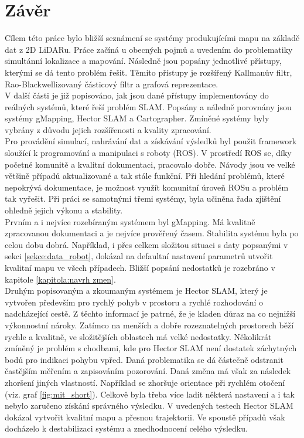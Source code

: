 \documentclass[12pt]{report}
\begin{document}
\chapter{Závěr}
Cílem této práce bylo bližší seznámení se systémy produkujícími mapu na základě dat z 2D LiDARu. Práce začíná u obecných pojmů a uvedením do problematiky simultánní lokalizace a mapování. Následně jsou popsány jednotlivé přístupy, kterými se dá tento problém řešit. Těmito přístupy je rozšířený Kallmanův filtr, Rao-Blackwellizovaný částicový filtr a grafová reprezentace.\\
\indent V další části je již popisováno, jak jsou dané přístupy implementovány do reálných systémů, které řeší problém SLAM. Popsány a náledně porovnány jsou systémy gMapping, Hector SLAM a Cartographer. Zmíněné systémy byly vybrány z důvodu jejich rozšířenosti a kvality zpracování.\\
\indent Pro provádění simulací, nahrávání dat a získávání výsledků byl použit framework sloužící k programování a manipulaci s roboty (ROS). V prostředí ROS se, díky početné komunitě a kvalitní dokumentaci, pracovalo dobře. Návody jsou ve velké většině případů aktualizované a tak stále funkční. Při hledání problémů, které nepokrývá dokumentace, je možnost využít komunitní úroveň ROSu a problém tak vyřešit. Při práci se samotnými třemi systémy, byla učiněna řada zjištění ohledně jejich výkonu a stability. \\
\indent Prvním a i nejvíce rozebíraným systémem byl gMapping. Má kvalitně zpracovanou dokumentaci a je nejvíce prověřený časem. Stabilita systému byla po celou dobu dobrá. Například, i přes celkem složitou situaci s daty popsanými v sekci \ref{sekce:data_robot}, dokázal na defaultní nastavení parametrů utvořit kvalitní mapu ve všech případech. Bližší popsání nedostatků je rozebráno v kapitole \ref{kapitola:navrh zmen}.\\
\indent Druhým popisovaným a zkoumaným systémem je Hector SLAM, který je vytvořen především pro rychlý pohyb v prostoru a rychlé rozhodování o nadcházející cestě. Z těchto informací je patrné, že je kladen důraz na co nejnižší výkonnostní nároky. Zatímco na menších a dobře rozeznatelných prostorech běží rychle a kvalitně, ve složitějších oblastech má velké nedostatky. Několikrát zmíněný je problém s chodbami, kde pro Hector SLAM není dostatek záchytných bodů pro indikaci pohybu vpřed. Daná problematika se dá částečně odstranit častějším měřením a zapisováním pozorování. Daná změna má však za následek zhoršení jiných vlastností. Například se zhoršuje orientace při rychlém otočení (viz. graf \ref{fig:mit_short}). Celkově byla třeba více ladit některá nastavení a i tak nebylo zaručeno získání správného výsledku. V uvedených testech Hector SLAM dokázal vytvořit kvalitní mapu a přesnou trajektorii. Ve spoustě případů však docházelo k destabilizaci systému a znedhodnocení celého výsledku.\\
\end{document}
